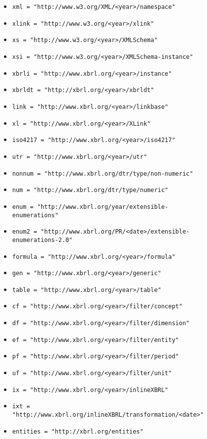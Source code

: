 \begin{figure}[H]
    \begin{itemize}
        \item \texttt{xml = "http://www.w3.org/XML/<year>/namespace"}
        \item \texttt{xlink = "http://www.w3.org/<year>/xlink"}
        \item \texttt{xs = "http://www.w3.org/<year>/XMLSchema"}
        \item \texttt{xsi = "http://www.w3.org/<year>/XMLSchema-instance"}
        \item \texttt{xbrli = "http://www.xbrl.org/<year>/instance"}
        \item \texttt{xbrldt = "http://xbrl.org/<year>/xbrldt"}
        \item \texttt{link = "http://www.xbrl.org/<year>/linkbase"}
        \item \texttt{xl = "http://www.xbrl.org/<year>/XLink"}
        \item \texttt{iso4217 = "http://www.xbrl.org/<year>/iso4217"}
        \item \texttt{utr = "http://www.xbrl.org/<year>/utr"}
        \item \texttt{nonnum = "http://www.xbrl.org/dtr/type/non-numeric"}
        \item \texttt{num = "http://www.xbrl.org/dtr/type/numeric"}
        \item \texttt{enum = "http://www.xbrl.org/year/extensible-enumerations"}
        \item \texttt{enum2 = "http://www.xbrl.org/PR/<date>/extensible-enumerations-2.0"}
        \item \texttt{formula = "http://www.xbrl.org/<year>/formula"}
        \item \texttt{gen = "http://www.xbrl.org/<year>/generic"}
        \item \texttt{table = "http://www.xbrl.org/<year>/table"}
        \item \texttt{cf = "http://www.xbrl.org/<year>/filter/concept"}
        \item \texttt{df = "http://www.xbrl.org/<year>/filter/dimension"}
        \item \texttt{ef = "http://www.xbrl.org/<year>/filter/entity"}
        \item \texttt{pf = "http://www.xbrl.org/<year>/filter/period"}
        \item \texttt{uf = "http://www.xbrl.org/<year>/filter/unit"}
        \item \texttt{ix = "http://www.xbrl.org/<year>/inlineXBRL"}
        \item \texttt{ixt = "http://www.xbrl.org/inlineXBRL/transformation/<date>"}
        \item \texttt{entities = "http://xbrl.org/entities"}
    \end{itemize}
\end{figure}

